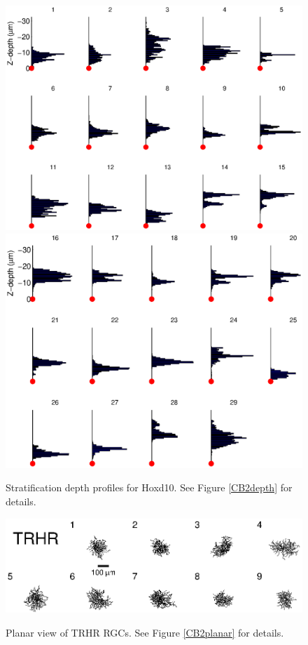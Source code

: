 \documentclass{article}
\begin{document}
\clearpage

\begin{figure}
  \centering
  {\includegraphics[scale=1]{Figures/SupFig2/Hoxd10-stratification-depth-1}}
  {\includegraphics[scale=1]{Figures/SupFig2/Hoxd10-stratification-depth-16}}
  \caption{Stratification depth profiles for Hoxd10. See Figure
    \ref{CB2depth} for details.}
\end{figure}


\clearpage

\begin{figure}
  \centering
  {\includegraphics[scale=1.5]{Figures/SupFig1/TRHR-all-cells-1.eps}}
  \caption{Planar view of TRHR RGCs. See Figure \ref{CB2planar} for details.}
\end{figure}
\end{document}

